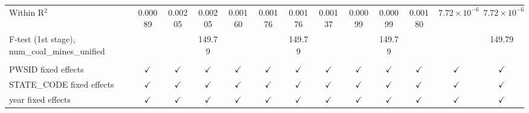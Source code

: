 \begin{table}[htbp]
\begin{adjustbox}{width = \textwidth, center}
\begin{tabular}{lcccccccccccc}
         Within R$^2$                                     & 0.00089       & 0.00205        & 0.00205       & 0.00160       & 0.00176       & 0.00176       & 0.00137       & 0.00099       & 0.00099       & 0.00180       & $7.72\times 10^{-6}$  & $7.72\times 10^{-6}$\\   
         F-test (1st stage), num\_coal\_mines\_unified    &               &                & 149.79        &               &               & 149.79        &               &               & 149.79        &               &                       & 149.79\\  
          \\
         PWSID fixed effects                              & $\checkmark$  & $\checkmark$   & $\checkmark$  & $\checkmark$  & $\checkmark$  & $\checkmark$  & $\checkmark$  & $\checkmark$  & $\checkmark$  & $\checkmark$  & $\checkmark$          & $\checkmark$\\   
         STATE\_CODE fixed effects                        & $\checkmark$  & $\checkmark$   & $\checkmark$  & $\checkmark$  & $\checkmark$  & $\checkmark$  & $\checkmark$  & $\checkmark$  & $\checkmark$  & $\checkmark$  & $\checkmark$          & $\checkmark$\\   
         year fixed effects                               & $\checkmark$  & $\checkmark$   & $\checkmark$  & $\checkmark$  & $\checkmark$  & $\checkmark$  & $\checkmark$  & $\checkmark$  & $\checkmark$  & $\checkmark$  & $\checkmark$          & $\checkmark$\\   
         \bottomrule
      \end{tabular}
   \end{adjustbox}
\end{table}


